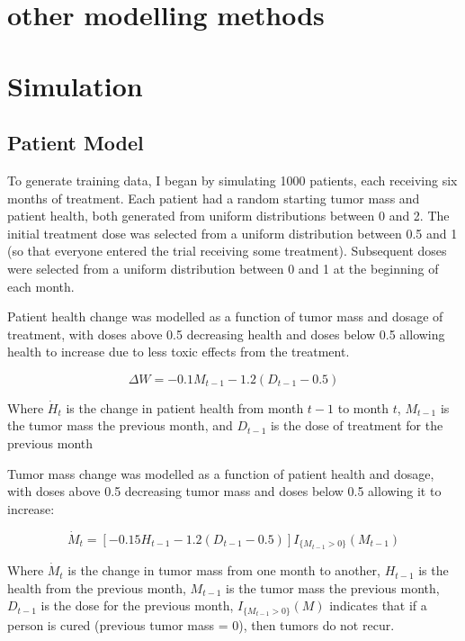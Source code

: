 \documentclass[12pt]{article}
\begin{document}

\section{other modelling methods} %
\label{sec:other_modelling_methods}


\section{Simulation}

\subsection{Patient Model} %
\label{sub:vpm}

To generate training data, I began by simulating 1000 patients, each receiving six months of treatment. Each patient had a random starting tumor mass and patient health, both generated from uniform distributions between 0 and 2. The initial treatment dose was selected from a uniform distribution between 0.5 and 1 (so that everyone entered the trial receiving some treatment). Subsequent doses were selected from a uniform distribution between 0 and 1 at the beginning of each month.

Patient health change was modelled as a function of tumor mass and dosage of treatment, with doses above 0.5 decreasing health and doses below 0.5 allowing health to increase due to less toxic effects from the treatment.

\[
\Delta W = - 0.1 M_{t-1} - 1.2 (D_{t-1} - 0.5)
\]

Where $\dot{H}_{t}$ is the change in patient health from month $t-1$ to month $t$, 
$M_{t-1}$ is the tumor mass the previous month, and 
$D_{t-1}$ is the dose of treatment for the previous month

Tumor mass change was modelled as a function of patient health and dosage, with doses above 0.5 decreasing tumor mass and doses below 0.5 allowing it to increase:

\[
\dot{M}_{t} = [- 0.15 H_{t-1} - 1.2 (D_{t-1} - 0.5)] I_{\{M_{t-1} > 0\}}(M_{t-1})
\]

Where $\dot{M}_{t}$ is the change in tumor mass from one month to another,
$H_{t-1}$ is the health from the previous month,
$M_{t-1}$ is the tumor mass the previous month,
$D_{t-1}$ is the dose for the previous month,
$I_{\{M_{t-1} > 0\}}(M)$ indicates that if a person is cured (previous tumor mass = 0), then tumors do not recur.
\end{document}
